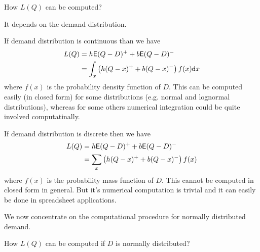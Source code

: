 \begin{question}
How $L(Q)$ can be computed?
\end{question}

\begin{solution}
It depends on the demand distribution. 

If demand distribution is continuous than we have 
\begin{align*}
L(Q) & = h \mathsf{E} (Q-D)^+ + b \mathsf{E} (Q-D)^- \\
	 & = \int_x \left(h (Q-x)^+ + b (Q-x)^-\right) f(x) \mathsf{d} x
\end{align*}
where $f(x)$ is the probability density function of $D$. This can be computed easily (in closed form) for some distributions (e.g. normal and lognormal distributions), whereas for some others numerical integration could be quite involved computatinally.

If demand distribution is discrete then we have 
\begin{align*}
L(Q) & = h \mathsf{E} (Q-D)^+ + b \mathsf{E} (Q-D)^- \\
	 & = \sum_x \left(h (Q-x)^+ + b (Q-x)^-\right) f(x)
\end{align*}
where $f(x)$ is the probability mass function of $D$. This cannot be computed in closed form in general. But it's numerical computation is trivial and it can easily be done in spreadsheet applications.
\end{solution}


We now concentrate on the computational procedure for normally distributed demand. 

\begin{question}
How $L(Q)$ can be computed if $D$ is normally distributed?
\end{question}

